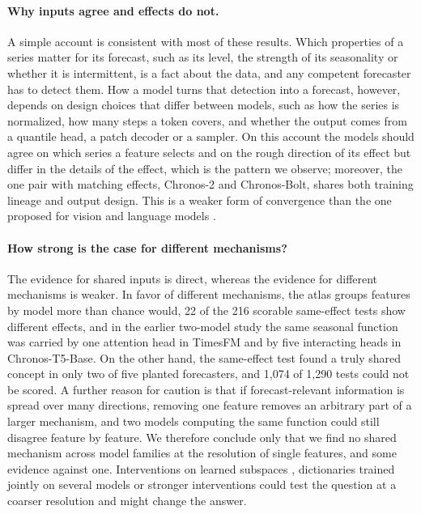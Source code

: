 \documentclass[twoside,11pt]{article}
\begin{document}
\paragraph{Why inputs agree and effects do not.}
A simple account is consistent with most of these results. Which properties of a series matter for its forecast, such as its level, the strength of its seasonality or whether it is intermittent, is a fact about the data, and any competent forecaster has to detect them.
How a model turns that detection into a forecast, however, depends on design choices that differ between models, such as how the series is normalized, how many steps a token covers, and whether the output comes from a quantile head, a patch decoder or a sampler.
On this account the models should agree on which series a feature selects and on the rough direction of its effect but differ in the details of the effect, which is the pattern we observe; moreover, the one pair with matching effects, Chronos-2 and Chronos-Bolt, shares both training lineage and output design.
This is a weaker form of convergence than the one proposed for vision and language models \citep{li2016convergent,huh2024platonic}.

\paragraph{How strong is the case for different mechanisms?}
The evidence for shared inputs is direct, whereas the evidence for different mechanisms is weaker. In favor of different mechanisms, the atlas groups features by model more than chance would, 22 of the 216 scorable same-effect tests show different effects, and in the earlier two-model study the same seasonal function was carried by one attention head in TimesFM and by five interacting heads in Chronos-T5-Base.
On the other hand, the same-effect test found a truly shared concept in only two of five planted forecasters, and 1{,}074 of 1{,}290 tests could not be scored.
A further reason for caution is that if forecast-relevant information is spread over many directions, removing one feature removes an arbitrary part of a larger mechanism, and two models computing the same function could still disagree feature by feature.
We therefore conclude only that we find no shared mechanism across model families at the resolution of single features, and some evidence against one.
Interventions on learned subspaces \citep{geiger2021causal}, dictionaries trained jointly on several models \citep{lindsey2024crosscoders} or stronger interventions could test the question at a coarser resolution and might change the answer.
\end{document}
